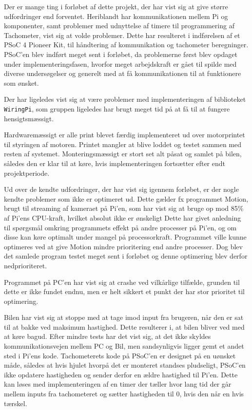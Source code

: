 Der er mange ting i forløbet af dette projekt, der har vist sig at give større udfordringer end forventet. 
Heriblandt har \IIC kommunikationen mellem Pi og \IIC komponenter, samt problemer med udnyttelse af timere til programmering af Tachometer, vist sig at volde problemer. 
Dette har resulteret i indførelsen af et PSoC 4 Pioneer Kit, til håndtering af \IIC kommunikation og tachometer beregninger. 
PSoC'en blev indført meget sent i forløbet, da problemerne først blev opdaget under implementeringsfasen, hvorfor meget arbejdskraft er gået til spilde med diverse undersøgelser og generelt med at få kommunikationen til at funktionere som ønsket.

Der har ligeledes vist sig at være problemer med implementeringen af biblioteket \texttt{WiringPi}, som gruppen ligeledes har brugt meget tid på at få til at fungere hensigtsmæssigt.

Hardwaremæssigt er alle print blevet færdig implementeret ud over motorprintet til styringen af motoren. 
Printet mangler at blive loddet og testet sammen med resten af systemet.
Monteringsmæssigt er stort set alt påsat og samlet på bilen, således den er klar til at køre, hvis implementeringen fortsætter efter endt projektperiode.

Ud over de kendte udfordringer, der har vist sig igennem forløbet, er der nogle kendte problemer som ikke er optimeret ud. 
Dette gælder fx programmet Motion, brugt til streaming af kameraet på Pi'en, som har vist sig at bruge op mod 85\% af Pi'ens CPU-kraft, hvilket absolut ikke er ønskeligt
Dette har givet anledning til spørgsmål omkring programmets effekt på andre processer på Pi'en, og om disse kan køre optimalt under mangel på processorkraft. 
Programmet ville kunne optimeres ved at give Motion mindre prioritering end andre processer. 
Dog blev det samlede program testet meget sent i forløbet og denne optimering blev derfor nedprioriteret.

Programmet på PC'en har vist sig at crashe ved vilkårlige tilfælde, grunden til dette er ikke fundet endnu, men er helt sikkert et punkt der har stor prioritet til optimering.

Bilen har vist sig at stoppe med at tage imod input fra brugeren, når den er sat til at bakke ved maksimum hastighed. Dette resulterer i, at bilen bliver ved med at køre bagud. Efter mindre tests har det vist sig, at det ikke skyldes kommunikationsvejen mellem PC og Bil, men sandsynligvis ligger gemt et andet sted i Pi'ens kode. Tachometerets kode på PSoC'en er designet på en uønsket måde, således at hvis hjulet hvorpå det er monteret standses pludseligt, PSoC'en ikke opdatere hastigheden og sender derfor en ældre hastighed til Pi'en. Dette kan løses med implementeringen af en timer der tæller hvor lang tid der går mellem inputs fra tachometeret og sætter hastigheden til 0, hvis den når en hvis tærskel.

